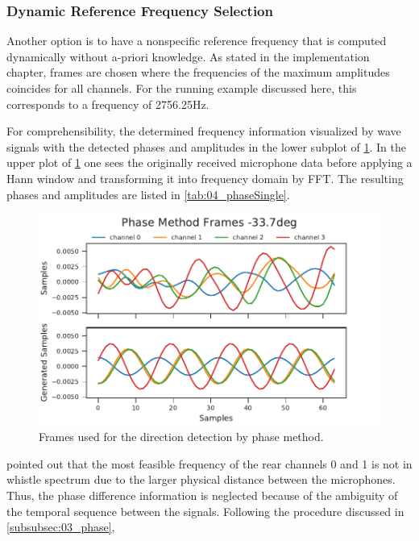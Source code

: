 \subsubsection*{Dynamic Reference Frequency Selection}

Another option is to have a nonspecific reference frequency that
is computed dynamically without a-priori knowledge.
As stated in the implementation chapter, frames are chosen where the frequencies
of the maximum amplitudes coincides for all channels.
For the running example discussed here, this corresponds to a frequency of 2756.25\si{\hertz}.

For comprehensibility, the determined frequency information visualized by
wave signals with the detected phases and amplitudes
in the lower subplot of \cref{fig:04_phaseSingle}.
In the upper plot of \cref{fig:04_phaseSingle} one sees the originally received microphone
data before applying a Hann window and transforming it into frequency domain by
\ac{FFT}. The resulting phases and amplitudes are listed in
\cref{tab:04_phaseSingle}.
\begin{figure}[H]
	\centering
		\includegraphics[]{figures/evaluation/phase_cos}
	\caption{Frames used for the direction detection by phase method.}
	\label{fig:04_phaseSingle}
\end{figure}
 pointed out that the most feasible frequency
of the rear channels 0 and 1 is not in whistle spectrum
due to the larger physical distance between the microphones.
Thus, the phase difference information is neglected because of the ambiguity of
the temporal sequence between the signals.
Following the procedure discussed in \cref{subsubsec:03_phase},
